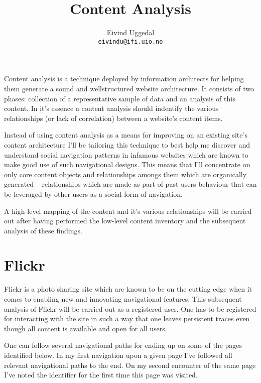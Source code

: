 \documentclass[12pt,a4paper]{article}
\title{Content Analysis}
\author{Eivind Uggedal\\
        \texttt{eivindu@ifi.uio.no}}
\date{}
\begin{document}
\maketitle{}

Content analysis is a technique deployed by information architects for helping
them generate a sound and wellstructured website architecture. It consists of
two phases: collection of a representative sample of data and an analysis of
this content. In it's essence a content analysis should indentify the various
relationships (or lack of correlation) between a website's content items.

Instead of using content analysis as a means for improving on an existing
site's content architecture I'll be tailoring this technique to best help me
discover and understand social navigation patterns in infamous websites which
are known to make good use of such navigational designs. This means that I'll
concentrate on only core content objects and relationships amongs them
which are organically generated -- relationships which are made as part of
past users behaviour that can be leveraged by other users as a social form
of navigation.

A high-level mapping of the content and it's various relationships
will be carried out after having performed the low-level content inventory
and the subsequent analysis of these findings.

\section{Flickr}

Flickr is a photo sharing site which are known to be on the cutting edge when
it comes to enabling new and innovating navigational features. This subsequent
analysis of Flickr will be carried out as a registered user. One has to be
registered for interacting with the site in such a way that one leaves
persistent traces even though all content is available and open for all users.

One can follow several navigational paths for ending up on some of the pages
identified below. In my first navigation upon a given page I've followed all
relevant navigational paths to the end. On my second encounter of the same
page I've noted the identifier for the first time this page was visited.
\end{document}
